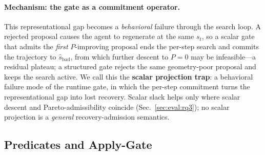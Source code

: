 \paragraph{Mechanism: the gate as a commitment operator.}
This representational gap becomes a \emph{behavioral} failure through the search loop. A rejected proposal causes the agent to regenerate at the same $s_t$, so a scalar gate that admits the \emph{first} $P$-improving proposal ends the per-step search and commits the trajectory to $\hat{s}_{\text{bad}}$, from which further descent to $P=0$ may be infeasible---a residual plateau; a structured gate rejects the same geometry-poor proposal and keeps the search active. We call this the \textbf{scalar projection trap}: a behavioral failure mode of the runtime gate, in which the per-step commitment turns the representational gap into lost recovery. Scalar slack helps only where scalar descent and Pareto-admissibility coincide (Sec.~\ref{sec:eval:rq3}); no scalar projection is a \emph{general} recovery-admission semantics.

\subsection{Predicates and Apply-Gate}
\label{sec:method:predicates}

